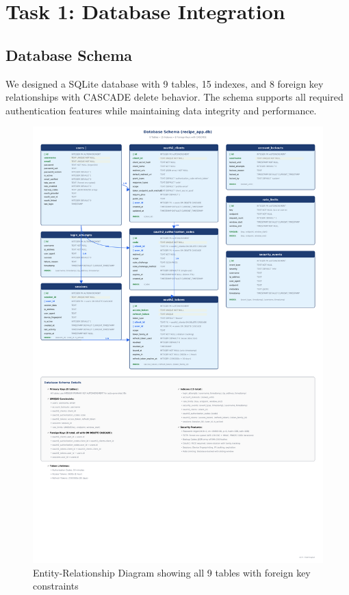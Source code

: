 \documentclass[12pt,a4paper]{article}
\begin{document}
\section{Task 1: Database Integration}

\subsection{Database Schema}

We designed a SQLite database with 9 tables, 15 indexes, and 8 foreign key relationships with CASCADE delete behavior. The schema supports all required authentication features while maintaining data integrity and performance.

\begin{figure}[H]
    \centering
    \includegraphics[width=\textwidth]{diagrams/4_database_er.pdf}
    \caption{Entity-Relationship Diagram showing all 9 tables with foreign key constraints}
    \label{fig:database}
\end{figure}
\end{document}
